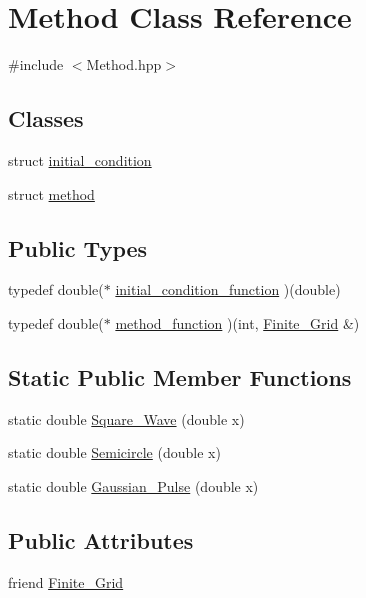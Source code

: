 \hypertarget{classMethod}{\section{Method Class Reference}
\label{classMethod}
}


{\ttfamily \#include $<$Method.\-hpp$>$}

\subsection*{Classes}
\begin{DoxyCompactItemize}
\item 
struct \hyperlink{structMethod_1_1initial__condition}{initial\-\_\-condition}
\item 
struct \hyperlink{structMethod_1_1method}{method}
\end{DoxyCompactItemize}
\subsection*{Public Types}
\begin{DoxyCompactItemize}
\item 
typedef double($\ast$ \hyperlink{classMethod_aa5f32411bc120712a9b4e780f593ccf0}{initial\-\_\-condition\-\_\-function} )(double)
\item 
typedef double($\ast$ \hyperlink{classMethod_a3aa0940bc4e4fdc07d065851cc8f7800}{method\-\_\-function} )(int, \hyperlink{classFinite__Grid}{Finite\-\_\-\-Grid} \&)
\end{DoxyCompactItemize}
\subsection*{Static Public Member Functions}
\begin{DoxyCompactItemize}
\item 
static double \hyperlink{classMethod_ad58a79d346f46c49dfb19c5340871a84}{Square\-\_\-\-Wave} (double x)
\item 
static double \hyperlink{classMethod_aadbd421df1e1508198bdece1e6048b80}{Semicircle} (double x)
\item 
static double \hyperlink{classMethod_a5de1d4fb03ee2a6a4d34baf57ef22e1c}{Gaussian\-\_\-\-Pulse} (double x)
\end{DoxyCompactItemize}
\subsection*{Public Attributes}
\begin{DoxyCompactItemize}
\item 
friend \hyperlink{classMethod_af5aaa9012b46115a1764f28162f75194}{Finite\-\_\-\-Grid}
\end{DoxyCompactItemize}
